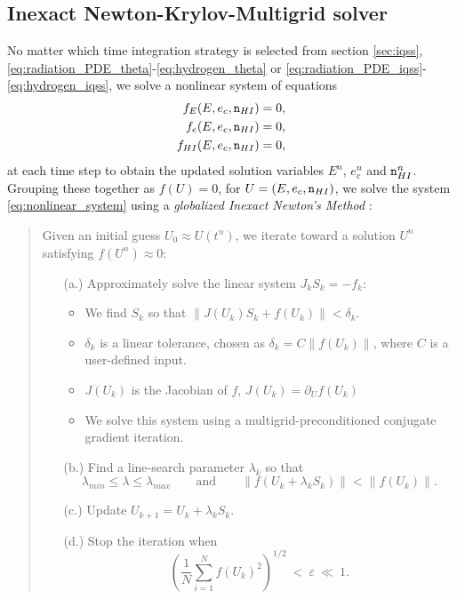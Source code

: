 \documentclass[letterpaper,10pt]{article}
\renewcommand{\(}{\left(}
\renewcommand{\)}{\right)}
\newcommand{\mn}{{\tt n}}
\begin{document}
\subsection{Inexact Newton-Krylov-Multigrid solver}
\label{sec:nkmg}
No matter which time integration strategy is selected from section
\ref{sec:iqss},
\eqref{eq:radiation_PDE_theta}-\eqref{eq:hydrogen_theta} or 
\eqref{eq:radiation_PDE_iqss}-\eqref{eq:hydrogen_iqss}, we solve a
nonlinear system of equations 
\begin{align}
  \notag
  f_E(E,e_c,\mn_{HI}) &= 0, \\
  \label{eq:nonlinear_system}
  f_e(E,e_c,\mn_{HI}) &= 0, \\
  \notag
  f_{HI}(E,e_c,\mn_{HI}) &= 0,
\end{align}
at each time step to obtain the updated solution variables $E^n$,
$e_c^n$ and $\mn_{HI}^n$.  Grouping these together as $f(U)=0$, for
$U=(E,e_c,\mn_{HI})$, we solve the system \eqref{eq:nonlinear_system}
using a {\em globalized Inexact Newton's Method}
\cite{Kelley1995,KeyesReynoldsWoodward2006,KnollKeyes2004}:
\begin{quote}
Given an initial guess $U_0\approx U(t^n)$, we iterate toward a
solution $U^n$ satisfying $f(U^n)\approx 0$:
\begin{itemize}
\item[(a.)] Approximately solve the linear system $J_k S_k = -f_k$:
\begin{itemize}
  \item We find $S_k$ so that $\|J(U_k) S_k + f(U_k)\| <
    \delta_k$. 
  \item $\delta_k$ is a linear tolerance, chosen as $\delta_k =
    C\|f(U_k)\|$, where $C$ is a user-defined input.
  \item $J(U_k)$ is the Jacobian of $f$, $J(U_k) = \partial_U f(U_k)$
  \item We solve this system using a multigrid-preconditioned
    conjugate gradient iteration.
  \end{itemize}
\item[(b.)] Find a line-search parameter $\lambda_k$ so that
  \[
    \lambda_{min} \le \lambda \le \lambda_{max}
    \qquad\text{and}\qquad \|f(U_k + \lambda_k S_k)\| < \|f(U_k)\|.
  \] 
\item[(c.)] Update $U_{k+1} = U_k + \lambda_k S_k$.
\item[(d.)] Stop the iteration when
  \[
    \left(\frac1N \sum_{i=1}^N f(U_k)^2 \right)^{1/2} \ < \
    \varepsilon \ \ll \ 1.
  \]
\end{itemize}
\end{quote}
\end{document}
